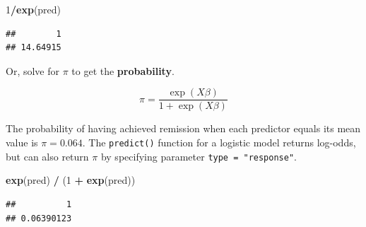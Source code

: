 \documentclass[
]{book}
\newenvironment{Shaded}{\begin{snugshade}}{\end{snugshade}}
\newcommand{\DataTypeTok}[1]{\textcolor[rgb]{0.13,0.29,0.53}{#1}}
\newcommand{\DecValTok}[1]{\textcolor[rgb]{0.00,0.00,0.81}{#1}}
\newcommand{\KeywordTok}[1]{\textcolor[rgb]{0.13,0.29,0.53}{\textbf{#1}}}
\newcommand{\NormalTok}[1]{#1}
\newcommand{\OperatorTok}[1]{\textcolor[rgb]{0.81,0.36,0.00}{\textbf{#1}}}
\newcommand{\StringTok}[1]{\textcolor[rgb]{0.31,0.60,0.02}{#1}}
\begin{document}
\begin{Shaded}
\begin{Highlighting}[]
\DecValTok{1}\OperatorTok{/}\KeywordTok{exp}\NormalTok{(pred)}
\end{Highlighting}
\end{Shaded}

\begin{verbatim}
##        1 
## 14.64915
\end{verbatim}

Or, solve for \(\pi\) to get the \textbf{probability}.

\[\pi = \frac{\exp (X \beta)}{1 + \exp (X \beta)}\]

The probability of having achieved remission when each predictor equals its mean value is \(\pi = 0.064\). The \texttt{predict()} function for a logistic model returns log-odds, but can also return \(\pi\) by specifying parameter \texttt{type\ =\ "response"}.

\begin{Shaded}
\begin{Highlighting}[]
\KeywordTok{exp}\NormalTok{(pred) }\OperatorTok{/}\StringTok{ }\NormalTok{(}\DecValTok{1} \OperatorTok{+}\StringTok{ }\KeywordTok{exp}\NormalTok{(pred))}
\end{Highlighting}
\end{Shaded}

\begin{verbatim}
##          1 
## 0.06390123
\end{verbatim}

\begin{Shaded}
\end{Shaded}
\end{document}
